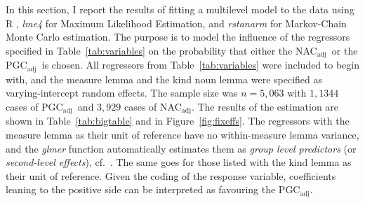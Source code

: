 \documentclass[USenglish]{article}
\newcommand{\Sub}[1]{\ensuremath{\mathrm{_{#1}}}}
\newcommand{\NACa}{NAC\Sub{adj}}
\newcommand{\PGCa}{PGC\Sub{adj}}
\begin{document}
In this section, I report the results of fitting a multilevel model to the data using R \citep{R}, \textit{lme4} \citep{lme4} for Maximum Likelihood Estimation, and \textit{rstanarm} \citep{rstanarm} for Markov-Chain Monte Carlo estimation.
The purpose is to model the influence of the regressors specified in Table~\ref{tab:variables} on the probability that either the \NACa\ or the \PGCa\ is chosen.
All regressors from Table~\ref{tab:variables} were included to begin with, and the measure lemma and the kind noun lemma were specified as varying-intercept random effects.
The sample size was $n=5,063$ with $1,1344$ cases of \PGCa\ and $3,929$ cases of \NACa.
The results of the estimation are shown in Table~\ref{tab:bigtable} and in Figure~\ref{fig:fixeffs}.
The regressors with the measure lemma as their unit of reference have no within-measure lemma variance, and the \textit{glmer} function automatically estimates them as \textit{group level predictors} (or \textit{second-level effects}), cf.\ \cite[265--269,302--304]{GelmanHill2006}.
The same goes for those listed with the kind lemma as their unit of reference.
Given the coding of the response variable, coefficients leaning to the positive side can be interpreted as favouring the \PGCa.
\end{document}
